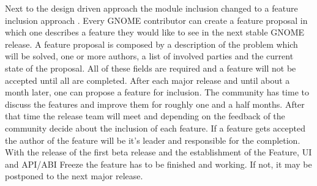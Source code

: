 Next to the design driven approach the module inclusion changed to a feature
inclusion approach \cite{GNOMEFeatures3.4,GNOMERoadMap}. Every GNOME
contributor can create a feature proposal in which one describes a feature they
would like to see in the next stable GNOME release. A feature proposal is
composed by a description of the problem which will be solved, one or more
authors, a list of involved parties and the current state of the proposal. All
of these fields are required and a feature will not be accepted until all are
completed. After each major release and until about a month later, one can
propose a feature for inclusion. The community has time to discuss the features
and improve them for roughly one and a half months. After that time the release
team will meet and depending on the feedback of the community decide about the
inclusion of each feature. If a feature gets accepted the author of the feature
will be it's leader and responsible for the completion. With the release of the
first beta release and the establishment of the Feature, \ac{UI} and
\ac{API}/\ac{ABI} Freeze the feature has to be finished and working. If not, it
may be postponed to the next major release.


